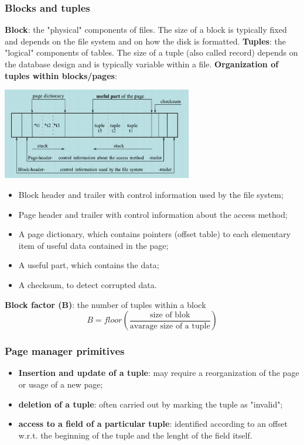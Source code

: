 \subsubsection{Blocks and tuples}
\textbf{Block}: the "physical" components of files. The size of a block is typically fixed and depends on the file system and on how the disk is formatted.\newline
\newline
\textbf{Tuples}: the "logical" components of tables. The size of a tuple (also called record) depends on the database design and is typically variable within a file.
\newline
\newline
\textbf{Organization of tuples within blocks/pages}:
\begin{center}
    \includegraphics[height=4cm]{../arguments/organizationoftuples.JPG}
\end{center}
\begin{itemize}
    \item Block header and trailer with control information used by the file system;
    \item Page header and trailer with control information about the access method;
    \item A page dictionary, which contains pointers (offset table) to each elementary item of useful data contained in the page;
    \item A useful part, which contains the data;
    \item A checksum, to detect corrupted data.
\end{itemize}
\textbf{Block factor (B)}: the number of tuples within a block
\[
    B = floor\left(\frac{\text{size of blok}}{\text{avarage size of a tuple}}\right)
\]
\subsubsection{Page manager primitives}
\begin{itemize}
    \item \textbf{Insertion and update of a tuple}: may require a reorganization of the page or usage of a new page;
    \item \textbf{deletion of a tuple}: often carried out by marking the tuple as "invalid";
    \item \textbf{access to a field of a particular tuple}: identified according to an offset w.r.t. the beginning of the tuple and the lenght of the field itself.
\end{itemize}
